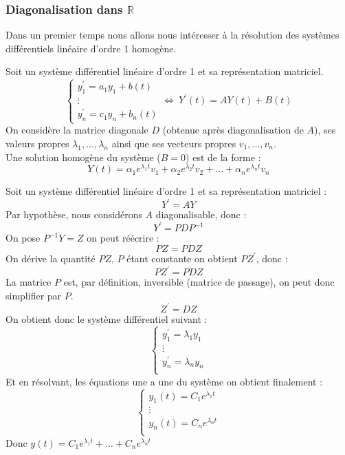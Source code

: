 \subsubsection{Diagonalisation dans $\mathbb{R}$}
Dans un premier temps nous allons nous intéresser à la résolution des systèmes différentiels linéaire d'ordre 1 homogène.
\begin{thm}[Théorème]
Soit un système différentiel linéaire d'ordre 1 et sa représentation matriciel.
$$
\begin{cases}
y_1^{\prime}=a_1 y_1 + b(t)\\
\vdots\\
y_{n}^{\prime}=c_1 y_n + b_n(t)
\end{cases}\Leftrightarrow\ Y^{\prime}(t)=AY(t)+B(t)$$
On considère la matrice diagonale $D$ (obtenue après diagonalisation de $A$), ses valeurs propres $\lambda_1,\hdots,\lambda_n$ ainsi que ses vecteurs propres $v_1,...,v_n$.\\
Une solution homogène du système ($B=0$) est de la forme :
$$Y(t)=\alpha_1 e^{\lambda_1 t}v_1 +\alpha_2 e^{\lambda_2 t}v_2+\hdots+\alpha_n e^{\lambda_n t}v_n$$
\end{thm}
\begin{demo}
Soit un système différentiel linéaire d'ordre 1 et sa représentation matriciel :
$$Y^{\prime}=AY$$
Par hypothèse, nous considérons $A$ diagonalisable, donc :
$$Y^{\prime}=PDP^{-1}$$
On pose $P^{-1}Y=Z$ on peut réécrire : 
$$PZ=PDZ$$
On dérive la quantité $PZ$, $P$ étant constante on obtient $PZ^{\prime}$, donc :
$$PZ^{\prime}=PDZ$$
La matrice $P$ est, par définition, inversible (matrice de passage), on peut donc simplifier par $P$.
$$Z^{\prime}=DZ$$
On obtient donc le système différentiel suivant :
$$\begin{cases}
y_1^{\prime}=\lambda_1 y_1\\
\vdots\\
y_n^{\prime}=\lambda_n y_n\\
\end{cases}$$
Et en résolvant, les équations une a une du système on obtient finalement :
$$\begin{cases}
y_1(t)=C_1 e^{\lambda_1 t}\\
\vdots\\
y_n(t)=C_n e^{\lambda_n t}\\
\end{cases}$$
Donc $y(t)=C_1 e^{\lambda_1 t}+\hdots+C_n e^{\lambda_n t}$
\end{demo}
